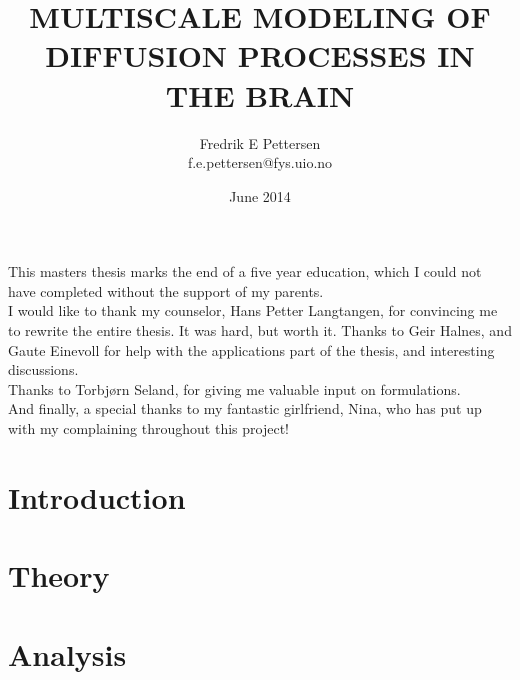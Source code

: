 \documentclass[twoside,english]{uiofysmaster}
\author{Fredrik E Pettersen\\ f.e.pettersen@fys.uio.no}
\title{\uppercase{Multiscale modeling of diffusion processes in the brain}}
\date{June 2014}
\begin{document}

\cleardoublepage



\begin{acknowledgements}
  This masters thesis marks the end of a five year education, which I could not have completed without the support of my parents.\\
  
  \noindent I would like to thank my counselor, Hans Petter Langtangen, for convincing me to rewrite the entire thesis. It was hard, but worth it. 
  Thanks to Geir Halnes, and Gaute Einevoll for help with the applications part of the thesis, and interesting discussions. \\
  
   \noindent Thanks to Torbjørn Seland, for giving me valuable input on formulations.\\
  
   \noindent And finally, a special thanks to my fantastic girlfriend, Nina, who has put up with my complaining throughout this project!
  
\end{acknowledgements}


\tableofcontents
\clearpage
\listoffigures

\clearpage
\printnomenclature


\chapter{Introduction}\label{chapter:introduction}
\clearpage


\chapter{Theory}\label{chapter:theory}
\clearpage


\chapter{Analysis}\label{chapter:analysis}
\clearpage

\end{document}
